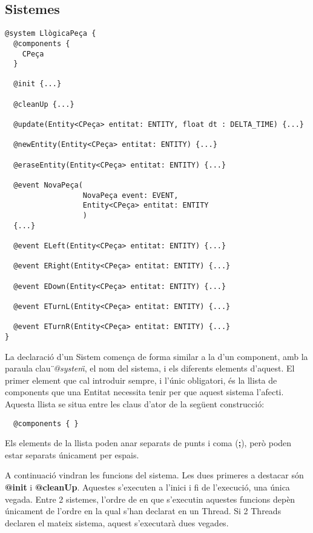 \subsection{Sistemes}

\begin{verbatim}
@system LlògicaPeça {
  @components {
    CPeça
  }
  
  @init {...}
  
  @cleanUp {...}
  
  @update(Entity<CPeça> entitat: ENTITY, float dt : DELTA_TIME) {...}
  
  @newEntity(Entity<CPeça> entitat: ENTITY) {...}
  
  @eraseEntity(Entity<CPeça> entitat: ENTITY) {...}
  
  @event NovaPeça(
                  NovaPeça event: EVENT, 
                  Entity<CPeça> entitat: ENTITY
                  )
  {...}
  
  @event ELeft(Entity<CPeça> entitat: ENTITY) {...}
  
  @event ERight(Entity<CPeça> entitat: ENTITY) {...}
  
  @event EDown(Entity<CPeça> entitat: ENTITY) {...}
  
  @event ETurnL(Entity<CPeça> entitat: ENTITY) {...}
  
  @event ETurnR(Entity<CPeça> entitat: ENTITY) {...}
}
\end{verbatim}

La declaració d'un Sistem comença de forma similar a la d'un component, amb la paraula clau {\em \"{}@system\"{}}, el nom del sistema, i els diferents elements d'aquest. El primer element que cal introduir sempre, i l'únic obligatori, és la llista de components que una Entitat necessita tenir per que aquest sistema l'afecti. Aquesta llista se situa entre les claus d'ator de la següent construcció:

\begin{verbatim}
  @components { }
\end{verbatim}

Els elements de la llista poden anar separats de punts i coma ({\bf ;}), però poden estar separats únicament per espais.

A continuació vindran les funcions del sistema. Les dues primeres a destacar són {\bf @init} i {\bf @cleanUp}. Aquestes s'executen a l'inici i fi de l'execució, una única vegada. Entre 2 sistemes, l'ordre de en que s'executin aquestes funcions depèn únicament de l'ordre en la qual s'han declarat en un Thread. Si 2 Threads declaren el mateix sistema, aquest s'executarà dues vegades.

